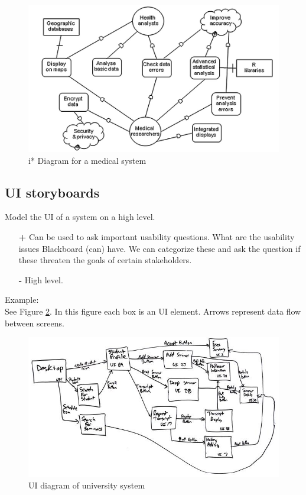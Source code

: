 \begin{figure}[h]
	\centering
	\includegraphics[width=0.75\linewidth]{istar.jpg}
	\caption{i* Diagram for a medical system}
	\label{fig:i_star}
\end{figure}

\clearpage
\subsection*{UI storyboards \cite{ui}}
Model the UI of a system on a high level.
\begin{itemize}
	\item[\textbf{+}] Can be used to ask important usability questions. What are the usability issues Blackboard (can) have. We can categorize these and ask the question if these threaten the goals of certain stakeholders.
	\item[\textbf{-}] High level.
\end{itemize}

Example:\\
See Figure \ref{fig:ui}. In this figure each box is an UI element. Arrows represent data flow between screens. 

\begin{figure}[h]
	\centering
	\includegraphics[width=0.75\linewidth]{uiFlow.jpg}
	\caption{UI diagram of university system}
	\label{fig:ui}
\end{figure}

